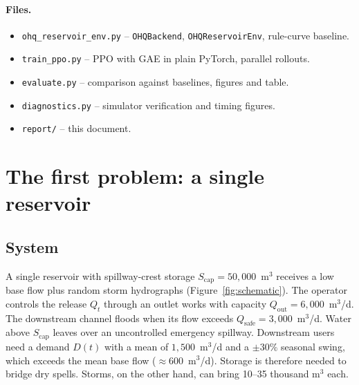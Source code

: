 \documentclass[11pt]{article}
\newcommand{\Scap}{S_{\mathrm{cap}}}
\newcommand{\Qsafe}{Q_{\mathrm{safe}}}
\newcommand{\code}[1]{\texttt{#1}}
\begin{document}
\paragraph{Files.}
\begin{itemize}\itemsep0pt
  \item \code{ohq\_reservoir\_env.py} -- \code{OHQBackend}, \code{OHQReservoirEnv}, rule-curve baseline.
  \item \code{train\_ppo.py} -- PPO with GAE in plain PyTorch, parallel rollouts.
  \item \code{evaluate.py} -- comparison against baselines, figures and table.
  \item \code{diagnostics.py} -- simulator verification and timing figures.
  \item \code{report/} -- this document.
\end{itemize}



\section{The first problem: a single reservoir}

\subsection{System}
A single reservoir with spillway-crest storage $\Scap = 50{,}000$~m$^3$
receives a low base flow plus random storm hydrographs
(Figure~\ref{fig:schematic}). The operator controls the release $Q_t$
through an outlet works with capacity $Q_{\mathrm{out}}=6{,}000$~m$^3$/d. The
downstream channel floods when its flow exceeds
$\Qsafe=3{,}000$~m$^3$/d. Water above $\Scap$ leaves over an uncontrolled
emergency spillway. Downstream users need a demand $D(t)$ with a mean of
$1{,}500$~m$^3$/d and a $\pm30\%$ seasonal swing, which exceeds the mean
base flow ($\approx600$~m$^3$/d). Storage is therefore needed to bridge dry
spells. Storms, on the other hand, can bring 10--35 thousand m$^3$ each.
\end{document}
